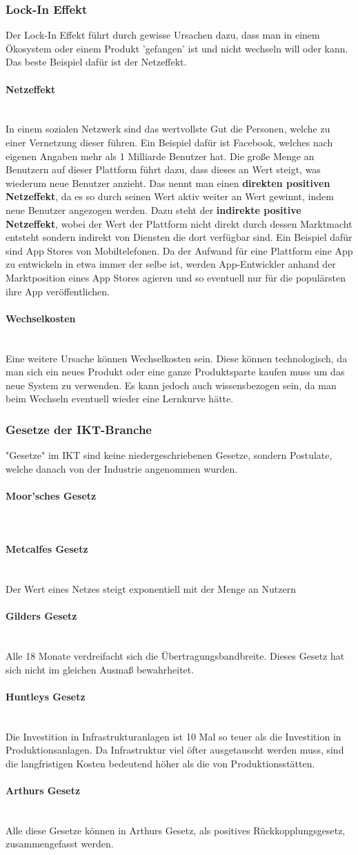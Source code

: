 \documentclass{article}
\newcommand{\paragraphlb}[1]{\paragraph{#1}\mbox{}\\}
\begin{document}
\begin{itemize}
		\subsubsection{Lock-In Effekt}
		Der Lock-In Effekt führt durch gewisse Ursachen dazu, dass man in einem Ökosystem oder einem Produkt 'gefangen' ist und nicht wechseln will oder kann. Das beste Beispiel dafür ist der Netzeffekt.
		\paragraphlb{Netzeffekt}
		In einem sozialen Netzwerk sind das wertvollste Gut die Personen, welche zu einer Vernetzung dieser führen. Ein Beispiel dafür ist Facebook, welches nach eigenen Angaben mehr als 1 Milliarde Benutzer hat. Die große Menge an Benutzern auf dieser Plattform führt dazu, dass dieses an Wert steigt, was wiederum neue Benutzer anzieht. Das nennt man einen \textbf{direkten positiven Netzeffekt}, da es so durch seinen Wert aktiv weiter an Wert gewinnt, indem neue Benutzer angezogen werden. Dazu steht der \textbf{indirekte positive Netzeffekt}, wobei der Wert der Plattform nicht direkt durch dessen Marktmacht entsteht sondern indirekt von Diensten die dort verfügbar sind. Ein Beispiel dafür sind App Stores von Mobiltelefonen. Da der Aufwand für eine Plattform eine App zu entwickeln in etwa immer der selbe ist, werden App-Entwickler anhand der Marktposition eines App Stores agieren und so eventuell nur für die populärsten ihre App veröffentlichen.
		\paragraphlb{Wechselkosten}
		Eine weitere Ursache können Wechselkosten sein. Diese können technologisch, da man sich ein neues Produkt oder eine ganze Produktsparte kaufen muss um das neue System zu verwenden. Es kann jedoch auch wissensbezogen sein, da man beim Wechseln eventuell wieder eine Lernkurve hätte.
		\subsubsection{Gesetze der IKT-Branche}
		"Gesetze" im IKT sind keine niedergeschriebenen Gesetze, sondern Postulate, welche danach von der Industrie angenommen wurden.
		\paragraphlb{Moor'sches Gesetz}
		\paragraphlb{Metcalfes Gesetz}
		Der Wert eines Netzes steigt exponentiell mit der Menge an Nutzern
		\paragraphlb{Gilders Gesetz}
		Alle 18 Monate verdreifacht sich die Übertragungsbandbreite. Dieses Gesetz hat sich nicht im gleichen Ausmaß bewahrheitet.
		\paragraphlb{Huntleys Gesetz}
		Die Investition in Infrastrukturanlagen ist 10 Mal so teuer als die Investition in Produktionsanlagen. Da Infrastruktur viel öfter ausgetauscht werden muss, sind die langfristigen Kosten bedeutend höher als die von Produktionsstätten.
		\paragraphlb{Arthurs Gesetz}
		Alle diese Gesetze können in Arthurs Gesetz, als positives Rückkopplungsgesetz, zusammengefasst werden.
		\end{itemize}
\end{document}
